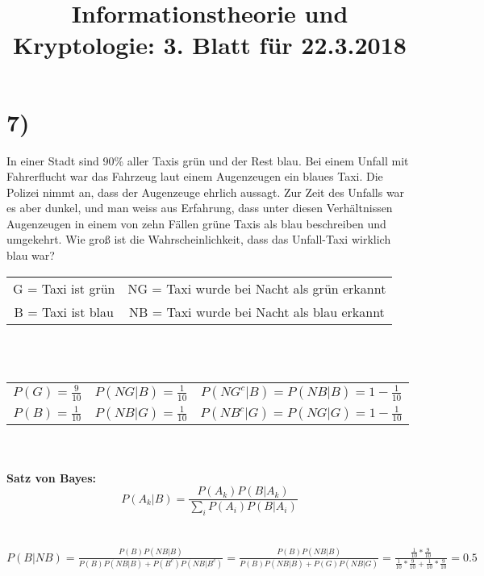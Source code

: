%



	\title{Informationstheorie und Kryptologie: 3. Blatt für 22.3.2018}
	\maketitle

	\section*{7)}

	In einer Stadt sind 90\% aller Taxis grün und der Rest blau. Bei einem Unfall mit Fahrerflucht war das Fahrzeug laut einem Augenzeugen ein blaues Taxi. Die Polizei nimmt an, dass der Augenzeuge ehrlich aussagt. Zur Zeit des Unfalls war es aber dunkel, und man weiss aus Erfahrung, dass unter diesen Verhältnissen Augenzeugen in einem von zehn Fällen grüne Taxis als blau beschreiben und umgekehrt. Wie groß ist die Wahrscheinlichkeit, dass das Unfall-Taxi wirklich blau war?\\
	\newline
	\def\arraystretch{1.5}%
	\begin{tabular}{cc}
		G = Taxi ist grün & NG = Taxi wurde bei Nacht als grün erkannt \\
		B = Taxi ist blau & NB = Taxi wurde bei Nacht als blau erkannt \\
	\end{tabular} \\
	\\
	\def\arraystretch{1.5}%
	\begin{tabular}{c|c|c}
		\(P(G) = \frac{9}{10}\) & \(P(NG|B) = \frac{1}{10}\) & \(P(NG^c|B) = P(NB|B) = 1 - \frac{1}{10}\) \\
		\(P(B) = \frac{1}{10}\) & \(P(NB|G) = \frac{1}{10}\) & \(P(NB^c|G) = P(NG|G) = 1 - \frac{1}{10}\) \\
	\end{tabular} \\
	\\
	\textbf{Satz von Bayes:}\\
	\[P(A_k|B) = \frac{P(A_k)P(B|A_k)}{\sum_{i}^{}P(A_i)P(B|A_i)} \]\\
	\\
	\(P(B|NB) = \frac{P(B)P(NB|B)}{P(B)P(NB|B) + P(B^c)P(NB|B^c)} = \frac{P(B)P(NB|B)}{P(B)P(NB|B) + P(G)P(NB|G)} = \frac{\frac{1}{10}*\frac{9}{10}}{\frac{1}{10}*\frac{9}{10} + \frac{1}{10}*\frac{9}{10}} = 0.5 \) \\

